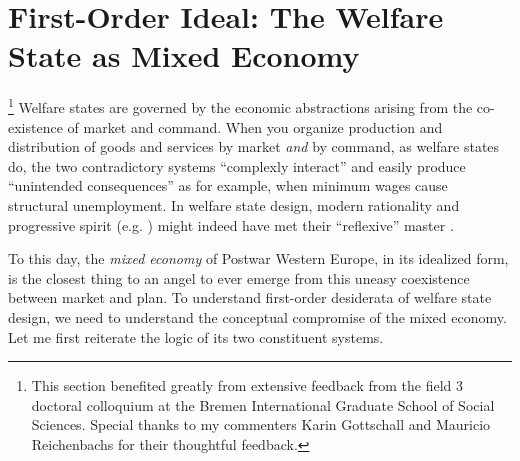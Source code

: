 

\section{First-Order Ideal: The Welfare State as Mixed Economy}\label{sec:mixed_economy}

\footnote
	{This section benefited greatly from extensive feedback from the field 3 doctoral colloquium at the Bremen International Graduate School of Social Sciences. Special thanks to my commenters Karin Gottschall and Mauricio Reichenbachs for their thoughtful feedback.}
Welfare states are governed by the economic abstractions arising from the co-existence of market and command.
When you organize production and distribution of goods and services by market \emph{and} by command, as welfare states do, the two contradictory systems ``complexly interact'' \citep{Perrow-1999-aa} and easily produce ``unintended consequences'' \citep{Merton-1936-aa} as for example, when minimum wages cause structural unemployment. In welfare state design, modern rationality \citep{Weber-1920-aa} and progressive spirit (e.g. \citealt{Offe2010}) might indeed have met their ``reflexive'' master \citep{BeckBonss-2003-aa}. 

To this day, the \emph{mixed economy} of Postwar Western Europe, in its idealized form, is the closest thing to an angel to ever emerge from this uneasy coexistence between market and plan. To understand first-order desiderata of welfare state design, we need to understand the  conceptual compromise of the mixed economy. Let me first reiterate the logic of its two constituent systems.

